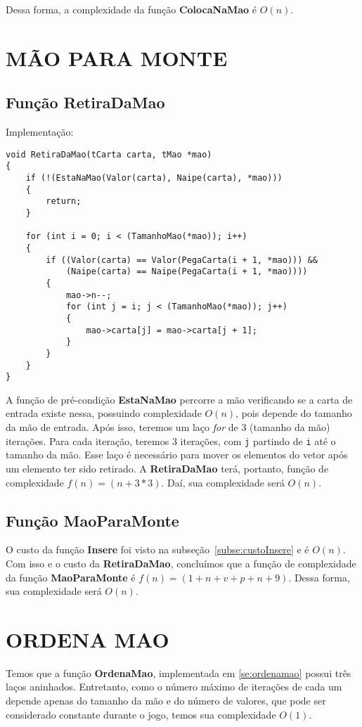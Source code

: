 \documentclass[12pt, oneside, a4paper, brazil]{abntex2}
\begin{document}
Dessa forma, a complexidade da função \textbf{ColocaNaMao} é $O(n)$.

\section{MÃO PARA MONTE}
\subsection{Função RetiraDaMao}
Implementação:
\begin{lstlisting}
void RetiraDaMao(tCarta carta, tMao *mao)
{
    if (!(EstaNaMao(Valor(carta), Naipe(carta), *mao)))
    {
        return;
    }

    for (int i = 0; i < (TamanhoMao(*mao)); i++)
    {
        if ((Valor(carta) == Valor(PegaCarta(i + 1, *mao))) &&
            (Naipe(carta) == Naipe(PegaCarta(i + 1, *mao))))
        {
            mao->n--;
            for (int j = i; j < (TamanhoMao(*mao)); j++)
            {
                mao->carta[j] = mao->carta[j + 1];
            }
        }
    }
}
\end{lstlisting}    

A função de pré-condição \textbf{EstaNaMao} percorre a mão verificando se a carta de entrada existe nessa, possuindo complexidade $O(n)$, pois depende do tamanho da mão de entrada.
Após isso, teremos um laço \textit{for} de 3 (tamanho da mão) iterações. Para cada iteração, teremos 3 iterações, com \texttt{j} partindo de \texttt{i} até o tamanho da mão. Esse laço é necessário para mover os elementos do vetor após um elemento ter sido retirado.
A \textbf{RetiraDaMao} terá, portanto, função de complexidade $f (n) = (n + 3 * 3)$. Daí, sua complexidade será $O(n)$.

\subsection{Função MaoParaMonte}
O custo da função \textbf{Insere} foi visto na subseção~\ref{subse:custoInsere} e é $O(n)$. Com isso e o custo da \textbf{RetiraDaMao}, concluímos que a função de complexidade da função \textbf{MaoParaMonte} é $ f(n) = (1 + n + v + p + n + 9)$. Dessa forma, sua complexidade será $O(n)$.


\section{ORDENA MAO}

Temos que a função \textbf{OrdenaMao}, implementada em \ref{se:ordenamao} possui três laços aninhados. Entretanto, como o número máximo de iterações de cada um depende apenas do tamanho da mão e do número de valores, que pode ser considerado constante durante o jogo, temos sua complexidade $O(1)$.
\end{document}
